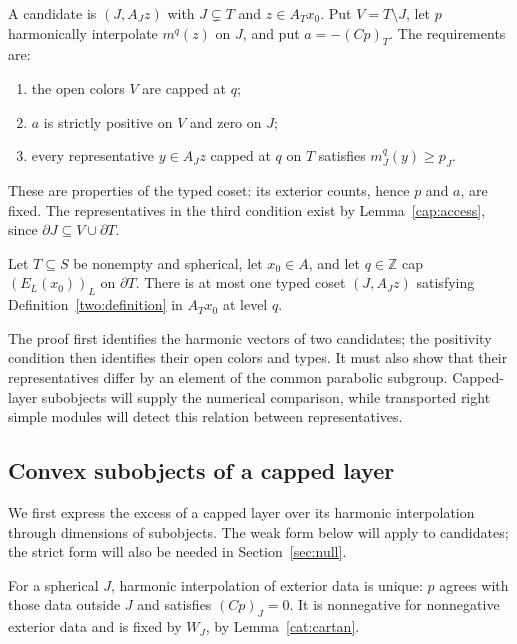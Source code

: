 \begin{definition}[Candidate]
\label{two:definition}
A candidate is $(J,A_Jz)$ with $J\subsetneq T$ and $z\in A_Tx_0$.
Put $V=T\setminus J$, let $p$ harmonically interpolate $m^q(z)$
on $J$, and put $a=-(Cp)_T$.  The requirements are:
\begin{enumerate}
\item the open colors $V$ are capped at $q$;
\item $a$ is strictly positive on $V$ and zero on $J$;
\item every representative $y\in A_Jz$ capped at $q$ on $T$
satisfies $m_J^q(y)\ge p_J$.
\end{enumerate}
\end{definition}

These are properties of the typed coset: its exterior counts, hence
$p$ and $a$, are fixed.  The representatives in the third condition
exist by Lemma~\ref{cap:access}, since
$\partial J\subseteq V\cup\partial T$.

\begin{proposition}
\label{two:uniqueness}
Let $T\subseteq S$ be nonempty and spherical, let $x_0\in A$, and let
$q\in\mathbb Z$ cap $(E_L(x_0))_L$ on $\partial T$.
There is at most one typed coset $(J,A_Jz)$ satisfying
Definition~\ref{two:definition} in $A_Tx_0$ at level $q$.
\end{proposition}

The proof first identifies the harmonic vectors of two candidates;
the positivity condition then identifies their open colors and types.
It must also show that their representatives differ by an element of
the common parabolic subgroup.  Capped-layer subobjects will supply
the numerical comparison, while transported right simple modules will
detect this relation between representatives.

\subsection{Convex subobjects of a capped layer}

We first express the excess of a capped layer over its harmonic
interpolation through dimensions of subobjects.  The weak form below
will apply to candidates; the strict form will also be needed in
Section~\ref{sec:null}.

For a spherical $J$, harmonic interpolation of exterior data is
unique: $p$ agrees with those data outside $J$ and satisfies
$(Cp)_J=0$.  It is nonnegative for nonnegative exterior data and is
fixed by $W_J$, by Lemma~\ref{cat:cartan}.

